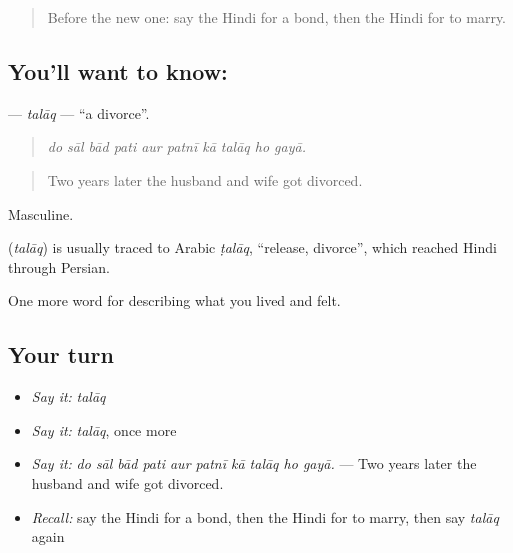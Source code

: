 \label{lesson:HI-C501-talaq}



\begin{quote}
Before the new one: say the Hindi for a bond, then the Hindi for to marry.
\end{quote}

\subsection*{You'll want to know: }
\textbf{} — \emph{talāq} — \textquotedblleft{}a divorce\textquotedblright{}.

\begin{quote}
         
\end{quote}

\begin{quote}
\emph{do sāl bād pati aur patnī kā talāq ho gayā.}
\end{quote}

\begin{quote}
Two years later the husband and wife got divorced.
\end{quote}

Masculine.

\begin{cousinweb}
\textbf{} (\emph{talāq}) is usually traced to Arabic \emph{ṭalāq}, \textquotedblleft{}release, divorce\textquotedblright{}, which reached Hindi through Persian.
\end{cousinweb}

\begin{grammarlens}[title={What you've built}]
One more word for describing what you lived and felt.
\end{grammarlens}

\subsection*{Your turn}
\begin{itemize}
\raggedright
  \item \emph{Say it:} \emph{talāq}
  \item \emph{Say it:} \emph{talāq}, once more
  \item \emph{Say it:} \emph{do sāl bād pati aur patnī kā talāq ho gayā.} — Two years later the husband and wife got divorced.
  \item \emph{Recall:} say the Hindi for a bond, then the Hindi for to marry, then say \emph{talāq} again
\end{itemize}


